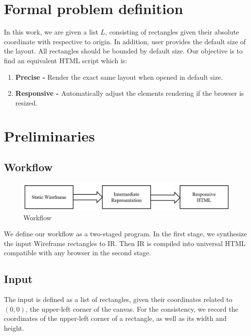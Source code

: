\documentclass[runningheads]{llncs}
\begin{document}
\section{Formal problem definition}
In this work, we are given a list $L$, consisting of rectangles given their absolute coordinate with respective to origin. In addition, user provides the default size of the layout. All rectangles should be bounded by default size. Our objective is to find an equivalent HTML script which is: 
\begin{enumerate}
  \item \textbf{Precise -} Render the exact same layout when opened in  default size.
  \item \textbf{Responsive -} Automatically adjust the elements rendering if the browser is resized.
\end{enumerate}
\section{Preliminaries}
\subsection{Workflow}
\begin{figure}[H]
  \vspace*{-0.1in}
  \includegraphics[width=1\textwidth]{src/workflow.JPG}
  \caption{Workflow}
\end{figure}
We define our workflow as a two-staged program. In the first stage, we synthesize the input Wireframe rectangles to IR. Then IR is compiled into universal HTML compatible with any browser in the second stage. 
\subsection{Input}
The input is defined as a list of rectangles, given their coordinates related to $(0,0)$, the upper-left corner of the canvas. For the consistency, we record the coordinates of the upper-left corner of a rectangle, as well as its width and height.
\end{document}
